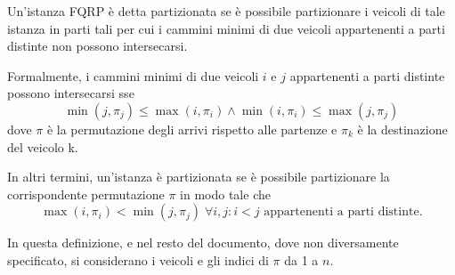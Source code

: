 \documentclass[../main.tex]{subfiles}
\begin{document}
\begin{definition}\label{def_part}
  Un'istanza FQRP è detta partizionata se è possibile partizionare i veicoli di tale istanza in parti tali per cui i cammini minimi di due veicoli appartenenti a parti distinte non possono intersecarsi.
\end{definition}
Formalmente, i cammini minimi di due veicoli $i$ e $j$ appartenenti a parti distinte possono intersecarsi sse
\[ \min(j, \pi_j) \leq \max(i, \pi_i) \wedge \min(i, \pi_i) \leq \max(j, \pi_j) \]
dove $\pi$ è la permutazione degli arrivi rispetto alle partenze e $\pi_k$ è la destinazione del veicolo k.

In altri termini, un'istanza è partizionata se è possibile partizionare la corrispondente permutazione $\pi$ in modo tale che
\begin{equation}
  \label{cond_part}
  \max(i, \pi_i) < \min(j, \pi_j)\;\forall i, j : i < j \mbox{ appartenenti a parti distinte}.
\end{equation}

In questa definizione, e nel resto del documento, dove non diversamente specificato, si considerano i veicoli e gli indici di $\pi$ da 1 a $n$.
\end{document}
